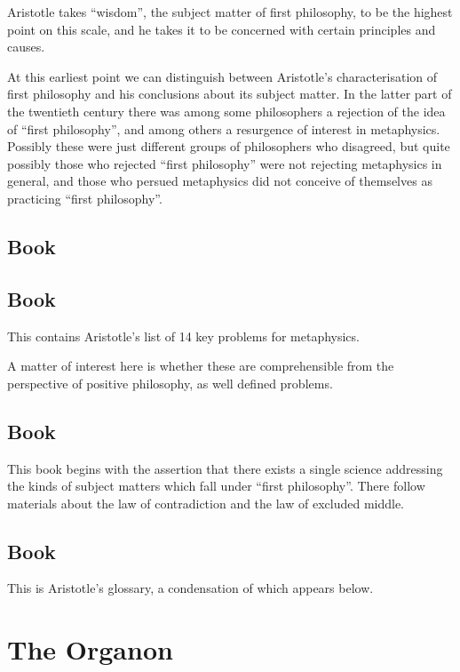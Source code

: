 Aristotle takes ``wisdom'', the subject matter of first philosophy, to be the highest point on this scale, and he takes it to be concerned with certain principles and causes.

At this earliest point we can distinguish between Aristotle's characterisation of first philosophy and his conclusions about its subject matter.
In the latter part of the twentieth century there was among some philosophers a rejection of the idea of ``first philosophy'', and among others a resurgence of interest in metaphysics.
Possibly these were just different groups of philosophers who disagreed, but quite possibly those who rejected ``first philosophy'' were not rejecting metaphysics in general, and those who persued metaphysics did not conceive of themselves as practicing ``first philosophy''.





\section{Book \Rbjalpha}

\section{Book \RbjBeta}

This contains Aristotle's list of 14 key problems for metaphysics.

A matter of interest here is whether these are comprehensible from the perspective of positive philosophy, as well defined problems.

\section{Book \RbjGamma}

This book begins with the assertion that there exists a single science addressing the kinds of subject matters which fall under ``first philosophy''.
There follow materials about the law of contradiction and the law of excluded middle.

\section{Book \RbjDelta}

This is Aristotle's glossary, a condensation of which appears below.

\chapter{The Organon}

